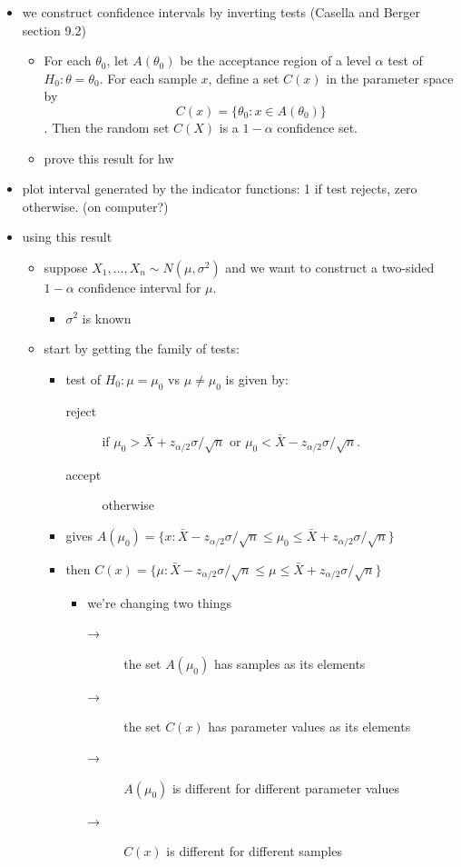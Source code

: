 \documentclass[11pt]{article}
\begin{document}
\begin{itemize}
\item we construct confidence intervals by inverting tests (Casella and
      Berger section 9.2)
\begin{itemize}
\item For each $\theta_0$, let $A(\theta_0)$ be the acceptance region
        of a level $\alpha$ test of $H_0: \theta = \theta_0$.  For each
        sample $x$, define a set $C(x)$ in the parameter space
        by \[C(x) = \{\theta_0: x \in A(\theta_0)\}\].  Then the random
        set $C(X)$ is a $1-\alpha$ confidence set.
\item prove this result for hw
\end{itemize}
\item plot interval generated by the indicator functions: 1 if test
      rejects, zero otherwise. (on computer?)
\item using this result
\begin{itemize}
\item suppose $X_1,\dots,X_n \sim N(\mu,\sigma^2)$ and we want to
        construct a two-sided $1-\alpha$ confidence interval for $\mu$.
\begin{itemize}
\item $\sigma^2$ is known
\end{itemize}
\item start by getting the family of tests:
\begin{itemize}
\item test of $H_0: \mu = \mu_0$ vs $\mu \neq \mu_0$ is given by:
\begin{description}
\item[reject] if $\mu_0 > \bar X + z_{\alpha/2}
                      \sigma / \sqrt{n}$ or $\mu_0 < \bar X - 
                      z_{\alpha/2} \sigma / \sqrt{n}$.
\item[accept] otherwise
\end{description}
\item gives $A(\mu_0) = \{x :\bar X - z_{\alpha/2} \sigma /
          \sqrt{n} \leq \mu_0 \leq \bar X + z_{\alpha/2} \sigma /
          \sqrt{n}\}$
\item then $C(x) = \{\mu :\bar X - z_{\alpha/2}  \sigma /
          \sqrt{n} \leq \mu \leq \bar X + z_{\alpha/2} \sigma /
          \sqrt{n}\}$
\begin{itemize}
\item we're changing two things
\begin{description}
\item[→] the set $A(\mu_0)$ has samples as its elements
\item[→] the set $C(x)$ has parameter values as its elements
\item[→] $A(\mu_0)$ is different for different parameter values
\item[→] $C(x)$ is different for different samples
\end{description}
\end{itemize}
\end{itemize}
\end{itemize}
\end{itemize}
\end{document}
